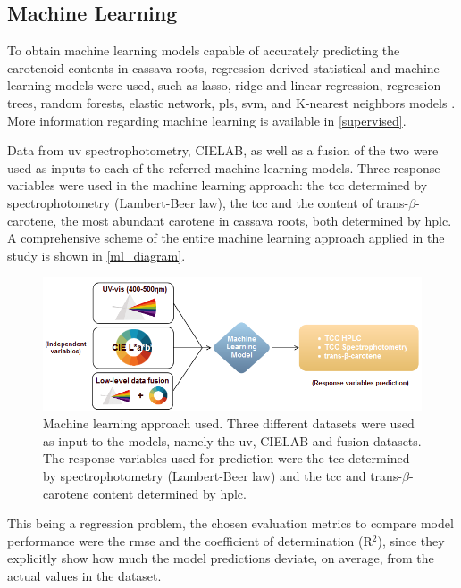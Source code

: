 \subsection{Machine Learning} \label{ML}

To obtain machine learning models capable of accurately predicting the carotenoid contents in cassava roots, regression-derived statistical and machine learning models were used, such as \acrfull{lasso}, ridge and linear regression, regression trees, random forests, elastic network, \acrfull{pls}, \acrfull{svm}, and K-nearest neighbors models \citep{singh2007review, domingos2012few}. More information regarding machine learning is available in \autoref{supervised}.

Data from \gls{uv} spectrophotometry, CIELAB, as well as a fusion of the two were used as inputs to each of the referred machine learning models. Three response variables were used in the machine learning approach: the \gls{tcc} determined by spectrophotometry (Lambert-Beer law), the \gls{tcc} and the content of trans-$\beta$-carotene, the most abundant carotene in cassava roots, both determined by \gls{hplc}. A comprehensive scheme of the entire machine learning approach applied in the study is shown in \autoref{ml_diagram}.

\begin{figure}[h]
	\centering
	\includegraphics[width=1\linewidth]{Imagens/Case_study/ml_diagram}
	\caption{Machine learning approach used. Three different datasets were used as input to the models, namely the \gls{uv}, CIELAB and fusion datasets. The response variables used for prediction were the \gls{tcc} determined by spectrophotometry (Lambert-Beer law) and the \gls{tcc} and trans-$\beta$-carotene content determined by \gls{hplc}.}
	\label{ml_diagram}
\end{figure}

This being a regression problem, the chosen evaluation metrics to compare model performance were the \acrfull{rmse} and the coefficient of determination (R$^{2}$), since they explicitly show how much the model predictions deviate, on average, from the actual values in the dataset.


